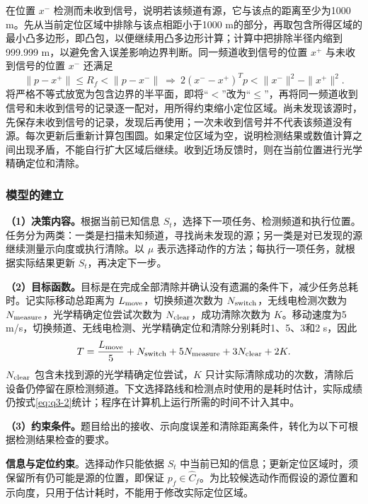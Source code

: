 在位置 $x^-$ 检测而未收到信号，说明若该频道有源，它与该点的距离至少为1000 m。先从当前定位区域中排除与该点相距小于1000 m的部分，再取包含所得区域的最小凸多边形，即凸包，以便继续用凸多边形计算；计算中把排除半径内缩到999.999 m，以避免舍入误差影响边界判断。同一频道收到信号的位置 $x^+$ 与未收到信号的位置 $x^-$ 还满足
\begin{equation}\label{eq:q3-3}
\|p-x^+\|\le R_f<\|p-x^-\|
\ \Longrightarrow\ 
2(x^--x^+)^Tp<\|x^-\|^2-\|x^+\|^2.
\end{equation}
将严格不等式放宽为包含边界的半平面，即将“$<$”改为“$\le$”，再将同一频道收到信号和未收到信号的记录逐一配对，用所得约束缩小定位区域。尚未发现该源时，先保存未收到信号的记录，发现后再使用；一次未收到信号并不代表该频道没有源。每次更新后重新计算包围圆。如果定位区域为空，说明检测结果或数值计算之间出现矛盾，不能自行扩大区域后继续。收到近场反馈时，则在当前位置进行光学精确定位和清除。

\Needspace{30mm}
\subsubsection{模型的建立}\label{sec:q3-2}

\textbf{（1）决策内容。}根据当前已知信息 $S_t$，选择下一项任务、检测频道和执行位置。任务分为两类：一类是扫描未知频道，寻找尚未发现的源；另一类是对已发现的源继续测量示向度或执行清除。以 $\mu$ 表示选择动作的方法；每执行一项任务，就根据实际结果更新 $S_t$，再决定下一步。

\textbf{（2）目标函数。}目标是在完成全部清除并确认没有遗漏的条件下，减少任务总耗时。记实际移动总距离为 $L_{\rm move}$，切换频道次数为 $N_{\rm switch}$，无线电检测次数为 $N_{\rm measure}$，光学精确定位尝试次数为 $N_{\rm clear}$，成功清除次数为 $K$。移动速度为5 m/s，切换频道、无线电检测、光学精确定位和清除分别耗时1、5、3和2 s，因此
\begin{equation}\label{eq:q3-2}
T=\frac{L_{\rm move}}{5}+N_{\rm switch}+5N_{\rm measure}+3N_{\rm clear}+2K.
\end{equation}
$N_{\rm clear}$ 包含未找到源的光学精确定位尝试，$K$ 只计实际清除成功的次数，清除后设备仍停留在原检测频道。下文选择路线和检测点时使用的是耗时估计，实际成绩仍按式\eqref{eq:q3-2}统计；程序在计算机上运行所需的时间不计入其中。

\textbf{（3）约束条件。}题目给出的接收、示向度误差和清除距离条件，转化为以下可根据检测结果检查的要求。

\textbf{信息与定位约束}。选择动作只能依据 $S_t$ 中当前已知的信息；更新定位区域时，须保留所有仍可能是源的位置，即保证 $p_f\in\widehat C_f$。为比较候选动作而假设的源位置和示向度，只用于估计耗时，不能用于修改实际定位区域。

